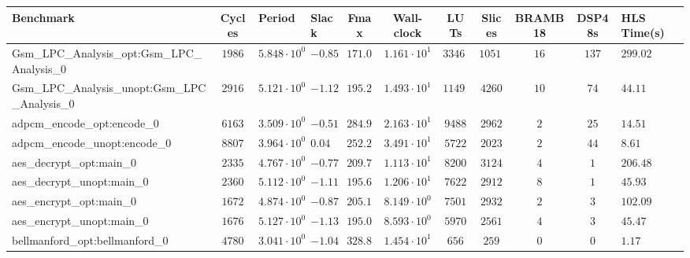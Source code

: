 \begin{tabular}{|l|c|HHc|c|c|c|c|cH|}
\hline
Benchmark                                       & Cycles       & Period                 & Slack     & Fmax       & Wall-clock              & LUTs       & Slices    & BRAMB18 & DSP48s  & HLS Time(s) \\
\hline
Gsm\_LPC\_Analysis\_opt:Gsm\_LPC\_Analysis\_0   & $ 1986     $ & $ 5.848 \cdot 10^{0} $ & $ -0.85 $ & $ 171.00 $ & $ 1.161 \cdot 10^{1}  $ & $ 33466  $ & $ 10517 $ & $ 16  $ & $ 137 $ & $ 299.02  $ \\
Gsm\_LPC\_Analysis\_unopt:Gsm\_LPC\_Analysis\_0 & $ 2916     $ & $ 5.121 \cdot 10^{0} $ & $ -1.12 $ & $ 195.27 $ & $ 1.493 \cdot 10^{1}  $ & $ 11490  $ & $ 4260  $ & $ 10  $ & $ 74  $ & $ 44.11   $ \\
adpcm\_encode\_opt:encode\_0                    & $ 6163     $ & $ 3.509 \cdot 10^{0} $ & $ -0.51 $ & $ 284.98 $ & $ 2.163 \cdot 10^{1}  $ & $ 9488   $ & $ 2962  $ & $ 2   $ & $ 25  $ & $ 14.51   $ \\
adpcm\_encode\_unopt:encode\_0                  & $ 8807     $ & $ 3.964 \cdot 10^{0} $ & $ 0.04  $ & $ 252.27 $ & $ 3.491 \cdot 10^{1}  $ & $ 5722   $ & $ 2023  $ & $ 2   $ & $ 44  $ & $ 8.61    $ \\
aes\_decrypt\_opt:main\_0                       & $ 2335     $ & $ 4.767 \cdot 10^{0} $ & $ -0.77 $ & $ 209.78 $ & $ 1.113 \cdot 10^{1}  $ & $ 8200   $ & $ 3124  $ & $ 4   $ & $ 1   $ & $ 206.48  $ \\
aes\_decrypt\_unopt:main\_0                     & $ 2360     $ & $ 5.112 \cdot 10^{0} $ & $ -1.11 $ & $ 195.62 $ & $ 1.206 \cdot 10^{1}  $ & $ 7622   $ & $ 2912  $ & $ 8   $ & $ 1   $ & $ 45.93   $ \\
aes\_encrypt\_opt:main\_0                       & $ 1672     $ & $ 4.874 \cdot 10^{0} $ & $ -0.87 $ & $ 205.17 $ & $ 8.149 \cdot 10^{0}  $ & $ 7501   $ & $ 2932  $ & $ 2   $ & $ 3   $ & $ 102.09  $ \\
aes\_encrypt\_unopt:main\_0                     & $ 1676     $ & $ 5.127 \cdot 10^{0} $ & $ -1.13 $ & $ 195.05 $ & $ 8.593 \cdot 10^{0}  $ & $ 5970   $ & $ 2561  $ & $ 4   $ & $ 3   $ & $ 45.47   $ \\
bellmanford\_opt:bellmanford\_0                 & $ 4780     $ & $ 3.041 \cdot 10^{0} $ & $ -1.04 $ & $ 328.84 $ & $ 1.454 \cdot 10^{1}  $ & $ 656    $ & $ 259   $ & $ 0   $ & $ 0   $ & $ 1.17    $ \\

\end{tabular}
